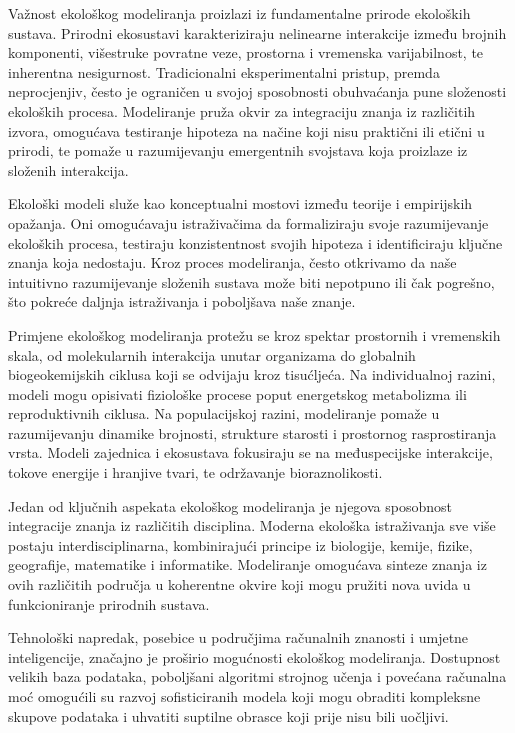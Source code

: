 \documentclass[11pt,oneside]{book}
\begin{document}
Važnost ekološkog modeliranja proizlazi iz fundamentalne prirode ekoloških sustava. Prirodni ekosustavi karakteriziraju nelinearne interakcije između brojnih komponenti, višestruke povratne veze, prostorna i vremenska varijabilnost, te inherentna nesigurnost. Tradicionalni eksperimentalni pristup, premda neprocjenjiv, često je ograničen u svojoj sposobnosti obuhvaćanja pune složenosti ekoloških procesa. Modeliranje pruža okvir za integraciju znanja iz različitih izvora, omogućava testiranje hipoteza na načine koji nisu praktični ili etični u prirodi, te pomaže u razumijevanju emergentnih svojstava koja proizlaze iz složenih interakcija.

Ekološki modeli služe kao konceptualni mostovi između teorije i empirijskih opažanja. Oni omogućavaju istraživačima da formaliziraju svoje razumijevanje ekoloških procesa, testiraju konzistentnost svojih hipoteza i identificiraju ključne znanja koja nedostaju. Kroz proces modeliranja, često otkrivamo da naše intuitivno razumijevanje složenih sustava može biti nepotpuno ili čak pogrešno, što pokreće daljnja istraživanja i poboljšava naše znanje.

Primjene ekološkog modeliranja protežu se kroz spektar prostornih i vremenskih skala, od molekularnih interakcija unutar organizama do globalnih biogeokemijskih ciklusa koji se odvijaju kroz tisućljeća. Na individualnoj razini, modeli mogu opisivati fiziološke procese poput energetskog metabolizma ili reproduktivnih ciklusa. Na populacijskoj razini, modeliranje pomaže u razumijevanju dinamike brojnosti, strukture starosti i prostornog rasprostiranja vrsta. Modeli zajednica i ekosustava fokusiraju se na međuspecijske interakcije, tokove energije i hranjive tvari, te održavanje bioraznolikosti.

Jedan od ključnih aspekata ekološkog modeliranja je njegova sposobnost integracije znanja iz različitih disciplina. Moderna ekološka istraživanja sve više postaju interdisciplinarna, kombinirajući principe iz biologije, kemije, fizike, geografije, matematike i informatike. Modeliranje omogućava sinteze znanja iz ovih različitih područja u koherentne okvire koji mogu pružiti nova uvida u funkcioniranje prirodnih sustava.

Tehnološki napredak, posebice u područjima računalnih znanosti i umjetne inteligencije, značajno je proširio mogućnosti ekološkog modeliranja. Dostupnost velikih baza podataka, poboljšani algoritmi strojnog učenja i povećana računalna moć omogućili su razvoj sofisticiranih modela koji mogu obraditi kompleksne skupove podataka i uhvatiti suptilne obrasce koji prije nisu bili uočljivi.
\end{document}

